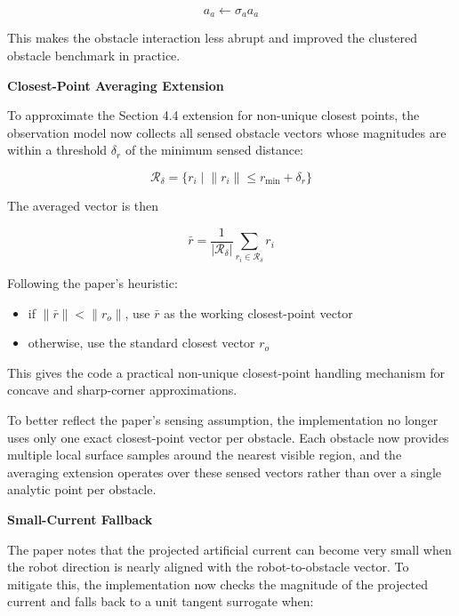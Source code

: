 \documentclass[11pt]{article}
\begin{document}
\begin{equation}
a_a \leftarrow \sigma_a a_a
\end{equation}

This makes the obstacle interaction less abrupt and improved the clustered
obstacle benchmark in practice.

\textbf{Closest-Point Averaging Extension}

To approximate the Section 4.4 extension for non-unique closest points, the
observation model now collects all sensed obstacle vectors whose magnitudes are
within a threshold $\delta_r$ of the minimum sensed distance:

\begin{equation}
\mathcal{R}_{\delta}
=
\{ r_i \mid \lVert r_i \rVert \le r_{\min} + \delta_r \}
\end{equation}

The averaged vector is then

\begin{equation}
\bar{r}
=
\frac{1}{|\mathcal{R}_{\delta}|}
\sum_{r_i \in \mathcal{R}_{\delta}} r_i
\end{equation}

Following the paper's heuristic:

\begin{itemize}[leftmargin=*]
  \item if $\lVert \bar{r} \rVert < \lVert r_o \rVert$, use $\bar{r}$ as the working closest-point vector
  \item otherwise, use the standard closest vector $r_o$
\end{itemize}

This gives the code a practical non-unique closest-point handling mechanism for
concave and sharp-corner approximations.

To better reflect the paper's sensing assumption, the implementation no longer
uses only one exact closest-point vector per obstacle. Each obstacle now
provides multiple local surface samples around the nearest visible region, and
the averaging extension operates over these sensed vectors rather than over a
single analytic point per obstacle.

\textbf{Small-Current Fallback}

The paper notes that the projected artificial current can become very small when
the robot direction is nearly aligned with the robot-to-obstacle vector. To
mitigate this, the implementation now checks the magnitude of the projected
current and falls back to a unit tangent surrogate when:
\end{document}
